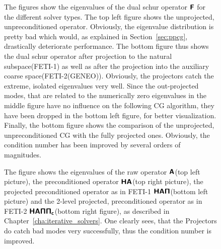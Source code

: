 \begin{figure}[tb]
  \begin{center}
    
    \caption[Study of eigenvalue distribution: distributions]{The figures show the eigenvalues of the dual schur operator $\boldsymbol{\mathsf{F}}$ for the different solver types. The top left figure shows the unprojected, unpreconditioned operator. Obviously, the eigenvalue distribution is pretty bad which would, as explained in Section~\ref{sec:ppcg}, drastically deteriorate performance. The bottom figure thus shows the dual schur operator after projection to the natural subspace(FETI-1) as well as after the projection into the auxiliary coarse space(FETI-2(GENEO)). Obviously, the projectors catch the extreme, isolated eigenvalues very well. Since the out-projected modes, that are related to the numerically zero eigenvalues in the middle figure have no influence on the following CG algorithm, they have been dropped in the bottom left figure, for better visualization.\\
    Finally, the bottom figure shows the comparison of the unprojected, unpreconditioned CG with the fully projected ones. Obviously, the condition number has been improved by several orders of magnitudes.}
    \label{fig:eigvalues_pointdistribution}
  \end{center}
\end{figure}

\begin{figure}[tb]
  \begin{center}
    
    \caption[Study of eigenvalue distribution: histograms]{The figure shows the eigenvalues of the  raw operator $\boldsymbol{\mathsf{A}}$(top left picture), the preconditioned operator $\boldsymbol{\mathsf{H}}\boldsymbol{\mathsf{A}}$(top right picture), the projected preconditioned operator as in FETI-1 $\boldsymbol{\mathsf{H}}\boldsymbol{\mathsf{A}}\boldsymbol{\mathsf{\Pi}}$(bottom left picture) and the 2-level projected, preconditioned operator as in FETI-2 $\boldsymbol{\mathsf{H}}\boldsymbol{\mathsf{A}}\boldsymbol{\mathsf{\Pi}}\boldsymbol{\mathsf{\Pi_c}}$(bottom right figure), as described in Chapter~\ref{cha:iterative_solvers}. One clearly sees, that the Projectors do catch bad modes very successfully, thus the condition number is improved.}		\label{fig:eigvalues_histograms}
  \end{center}
\end{figure}~

